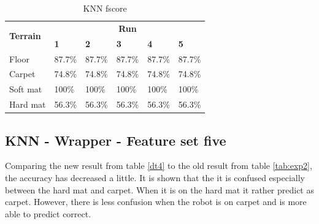 \documentclass[USenglish]{ifimaster}  %
\begin{document}
\begin{table}[h]
	\centering
	\begin{tabular}{@{}llllll@{}}
		\toprule
		\multirow{2}{*}{\textbf{Terrain}} & \multicolumn{5}{c}{\textbf{Run}} \\ \cmidrule(l){2-6} 
		& \multicolumn{1}{l|}{\textbf{1}} & \multicolumn{1}{l|}{\textbf{2}} & \multicolumn{1}{l|}{\textbf{3}} & \multicolumn{1}{l|}{\textbf{4}} & \textbf{5} \\ \midrule
		\multicolumn{1}{l|}{Floor} & \multicolumn{1}{l|}{87.7\%} & \multicolumn{1}{l|}{87.7\%} & \multicolumn{1}{l|}{87.7\%} & \multicolumn{1}{l|}{87.7\%} & 87.7\% \\ \midrule
		\multicolumn{1}{l|}{Carpet} & \multicolumn{1}{l|}{74.8\%} & \multicolumn{1}{l|}{74.8\%} & \multicolumn{1}{l|}{74.8\%} & \multicolumn{1}{l|}{74.8\%} & 74.8\% \\ \midrule
		\multicolumn{1}{l|}{Soft mat} & \multicolumn{1}{l|}{100\%} & \multicolumn{1}{l|}{100\%} & \multicolumn{1}{l|}{100\%} & \multicolumn{1}{l|}{100\%} & 100\% \\ \midrule
		\multicolumn{1}{l|}{Hard mat} & \multicolumn{1}{l|}{56.3\%} & \multicolumn{1}{l|}{56.3\%} & \multicolumn{1}{l|}{56.3\%} & \multicolumn{1}{l|}{56.3\%} & 56.3\% \\ \bottomrule
	\end{tabular}
	\caption{KNN fscore}
	\label{knnfscore}
\end{table}
\FloatBarrier

\subsection{KNN - Wrapper - Feature set five}
Comparing the new result from table \ref{dt4} to the old result from table \ref{tab:exp2}, the accuracy has decreased a little. It is shown that the it is confused especially between the hard mat and carpet. When it is on the hard mat it rather predict as carpet. However, there is less confusion when the robot is on carpet and is more able to predict correct.

 
\end{document}

